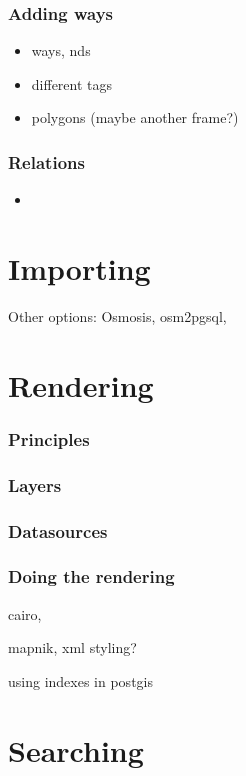 \documentclass{beamer}
\begin{document}
\begin{frame}
  \frametitle{Adding ways}
  \begin{itemize}
  \item ways, nds
  \item different tags
  \item polygons (maybe another frame?)
  \end{itemize}
\end{frame}


\begin{frame}
  \frametitle{Relations}
  \begin{itemize}
  \item
  \end{itemize}
\end{frame}

\section{Importing}

Other options: Osmosis, osm2pgsql,

\section{Rendering}

\begin{frame}
  \frametitle{Principles}
\end{frame}

\begin{frame}
  \frametitle{Layers}
\end{frame}

\begin{frame}
  \frametitle{Datasources}
\end{frame}

\begin{frame}
  \frametitle{Doing the rendering}
  cairo,
\end{frame}

\begin{frame}
  mapnik, xml styling?
\end{frame}

\begin{frame}
  using indexes in postgis
\end{frame}

\begin{frame}

\end{frame}

\section{Searching}
\end{document}

